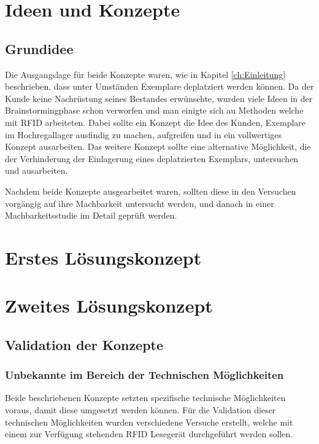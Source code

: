 \chapter{Ideen und Konzepte}

\section{Grundidee}
Die Ausgangslage für beide Konzepte waren, wie in Kapitel \ref{ch:Einleitung} beschrieben, dass unter Umständen Exemplare deplatziert werden können. Da der Kunde keine Nachrüstung seines Bestandes erwünschte, wurden viele Ideen in der Brainstormingphase schon verworfen und man einigte sich au Methoden welche mit RFID arbeiteten. Dabei sollte ein Konzept die Idee des Kunden, Exemplare im Hochregallager ausfindig zu machen, aufgreifen und in ein vollwertiges Konzept ausarbeiten. Das weitere Konzept sollte eine alternative Möglichkeit, die der Verhinderung der Einlagerung eines deplatzierten Exemplars, untersuchen und ausarbeiten.

Nachdem beide Konzepte ausgearbeitet waren, sollten diese in den Versuchen vorgängig auf ihre Machbarkeit untersucht werden, und danach in einer Machbarkeitsstudie im Detail geprüft werden.

\chapter{Erstes Lösungskonzept}



\chapter{Zweites Lösungskonzept}



\section{Validation der Konzepte}

\subsection{Unbekannte im Bereich der Technischen Möglichkeiten}
Beide beschriebenen Konzepte setzten spezifische technische Möglichkeiten voraus, damit diese umgesetzt werden können. Für die Validation dieser technischen Möglichkeiten wurden verschiedene Versuche erstellt, welche mit einem zur Verfügung stehenden RFID Lesegerät durchgeführt werden sollen.

